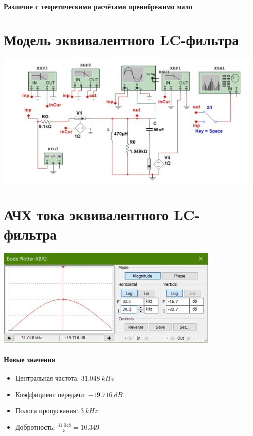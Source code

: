 \documentclass[12pt,a4paper]{article}
\begin{document}
	\paragraph*{Различие с теоретическими расчётами пренибрежимо мало}
	
	\section*{Модель эквивалентного LC-фильтра}
	
	\includegraphics[width=\linewidth]{src/model_2}
	
	\section*{АЧХ тока эквивалентного LC-фильтра}
	
	\includegraphics[width=0.5\linewidth]{src/MFH_2}
	
	\paragraph*{Новые значения}
	\begin{itemize}
		\item Центральная частота: $31.048 \: kHz$ 
		\item Коэффициент передачи: $-19.716 \: dB$
		\item Полоса пропускания: $3 \: kHz$
		\item Добротность: $\frac{31.048}{3} = 10.349$
	\end{itemize}
	
\end{document}
